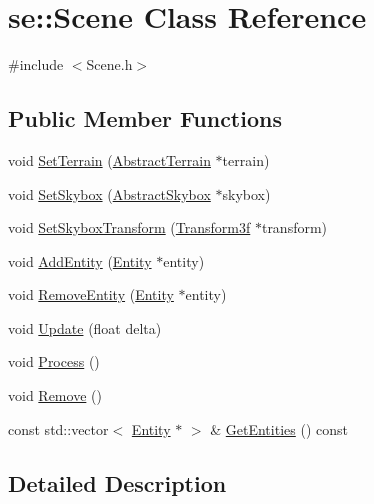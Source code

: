 \hypertarget{classse_1_1_scene}{}\section{se\+:\+:Scene Class Reference}
\label{classse_1_1_scene}


{\ttfamily \#include $<$Scene.\+h$>$}

\subsection*{Public Member Functions}
\begin{DoxyCompactItemize}
\item 
void \mbox{\hyperlink{classse_1_1_scene_ac8fddc56bc7f1385d640f24e75ea41d6}{Set\+Terrain}} (\mbox{\hyperlink{classse_1_1_abstract_terrain}{Abstract\+Terrain}} $\ast$terrain)
\item 
void \mbox{\hyperlink{classse_1_1_scene_a3e6547c6013dc83a23d6cc0f349955f0}{Set\+Skybox}} (\mbox{\hyperlink{classse_1_1_abstract_skybox}{Abstract\+Skybox}} $\ast$skybox)
\item 
void \mbox{\hyperlink{classse_1_1_scene_a75e3a3401c9d999f43baf01e89b16735}{Set\+Skybox\+Transform}} (\mbox{\hyperlink{classse_1_1_transform3f}{Transform3f}} $\ast$transform)
\item 
void \mbox{\hyperlink{classse_1_1_scene_a21dde7d731d672d4c424397850864549}{Add\+Entity}} (\mbox{\hyperlink{classse_1_1_entity}{Entity}} $\ast$entity)
\item 
void \mbox{\hyperlink{classse_1_1_scene_a5803cfd0f0dccf350f7a3fe478b3c834}{Remove\+Entity}} (\mbox{\hyperlink{classse_1_1_entity}{Entity}} $\ast$entity)
\item 
void \mbox{\hyperlink{classse_1_1_scene_acdc3858f5d4fd76cf9a712a02218341a}{Update}} (float delta)
\item 
void \mbox{\hyperlink{classse_1_1_scene_ade05c94ef257fef17c7f4979009f4995}{Process}} ()
\item 
void \mbox{\hyperlink{classse_1_1_scene_a73f7789f2585e65174380be509b88435}{Remove}} ()
\item 
const std\+::vector$<$ \mbox{\hyperlink{classse_1_1_entity}{Entity}} $\ast$ $>$ \& \mbox{\hyperlink{classse_1_1_scene_a1c3f1fc4ab110f9caab190cce13c2e03}{Get\+Entities}} () const
\end{DoxyCompactItemize}


\subsection{Detailed Description}



